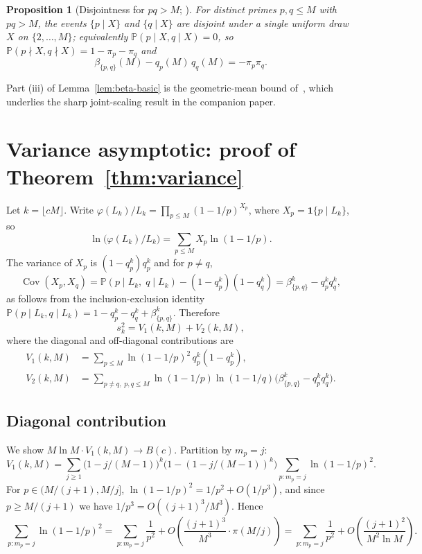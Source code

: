 \documentclass[11pt]{article}
\newtheorem{proposition}[theorem]{Proposition}
\theoremstyle{remark}
\newcommand{\PP}{\mathbb{P}}
\newcommand{\one}{\mathbf{1}}
\DeclareMathOperator{\Cov}{Cov}
\begin{document}
\begin{proposition}[Disjointness for $pq > M$; {\cite[Rem.~5.6]{wakid1}}]\label{prop:disjoint}
For distinct primes $p, q \leq M$ with $pq > M$, the events $\{p \mid X\}$ and $\{q \mid X\}$ are disjoint under a single uniform draw $X$ on $\{2, \ldots, M\}$; equivalently $\PP(p \mid X, q \mid X) = 0$, so $\PP(p \nmid X, q \nmid X) = 1 - \pi_p - \pi_q$ and
\[
\beta_{\{p,q\}}(M) - q_p(M)\, q_q(M) = -\pi_p \pi_q.
\]
\end{proposition}

Part (iii) of Lemma~\ref{lem:beta-basic} is the geometric-mean bound of~\cite[Lem.~2.4]{wakid1}, which underlies the sharp joint-scaling result in the companion paper.

\section{Variance asymptotic: proof of Theorem~\ref{thm:variance}}\label{sec:variance-proof}

Let $k = \lfloor cM \rfloor$. Write $\varphi(L_k)/L_k = \prod_{p \leq M}(1 - 1/p)^{X_p}$, where $X_p = \one\{p \mid L_k\}$, so
\[
\ln\bigl(\varphi(L_k)/L_k\bigr) = \sum_{p \leq M} X_p \ln(1 - 1/p).
\]
The variance of $X_p$ is $(1 - q_p^k) q_p^k$ and for $p \neq q$,
\[
\Cov(X_p, X_q) = \PP(p \mid L_k,\; q \mid L_k) - (1 - q_p^k)(1 - q_q^k) = \beta_{\{p,q\}}^k - q_p^k q_q^k,
\]
as follows from the inclusion-exclusion identity $\PP(p \mid L_k, q \mid L_k) = 1 - q_p^k - q_q^k + \beta_{\{p,q\}}^k$. Therefore
\begin{equation}\label{eq:Var-W-decomp}
s_k^2 = V_1(k, M) + V_2(k, M),
\end{equation}
where the diagonal and off-diagonal contributions are
\begin{align*}
V_1(k, M) &= \sum_{p \leq M} \ln(1 - 1/p)^2\, q_p^k (1 - q_p^k),\\
V_2(k, M) &= \sum_{p \neq q,\; p, q \leq M} \ln(1 - 1/p) \ln(1 - 1/q)\bigl(\beta_{\{p,q\}}^k - q_p^k q_q^k\bigr).
\end{align*}

\subsection{Diagonal contribution}\label{sec:variance-V1}

We show $M \ln M \cdot V_1(k, M) \to B(c)$. Partition by $m_p = j$:
\[
V_1(k, M) = \sum_{j \geq 1}\bigl(1 - j/(M-1)\bigr)^k\bigl(1 - (1 - j/(M-1))^k\bigr) \sum_{p \colon m_p = j} \ln(1 - 1/p)^2.
\]
For $p \in (M/(j+1), M/j]$, $\ln(1 - 1/p)^2 = 1/p^2 + O(1/p^3)$, and since $p \geq M/(j+1)$ we have $1/p^3 = O((j+1)^3/M^3)$. Hence
\[
\sum_{p \colon m_p = j} \ln(1 - 1/p)^2 = \sum_{p \colon m_p = j} \frac{1}{p^2} + O\!\left(\frac{(j+1)^3}{M^3}\cdot \pi(M/j)\right) = \sum_{p \colon m_p = j} \frac{1}{p^2} + O\!\left(\frac{(j+1)^2}{M^2 \ln M}\right).
\]
\end{document}
